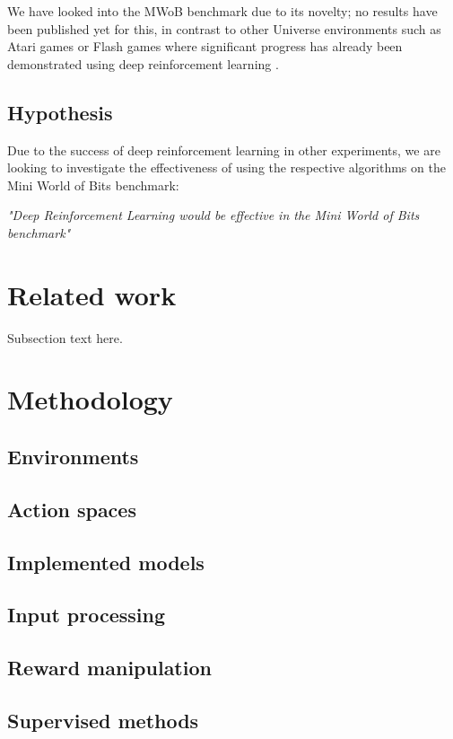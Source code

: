 \documentclass[conference]{IEEEtran}
\begin{document}
We have looked into the MWoB benchmark due to its novelty; no results have been published yet for this, in contrast to other Universe environments such as Atari games or Flash games where significant progress has already been demonstrated using deep reinforcement learning \cite{mnih2013playing}.

\subsection{Hypothesis}
Due to the success of deep reinforcement learning in other experiments, we are looking to investigate the effectiveness of using the respective algorithms on the Mini World of Bits benchmark:
\begin{center}
\textit{"Deep Reinforcement Learning would be effective in the Mini World of Bits benchmark"}
\end{center}

\section{Related work}
Subsection text here.

\section{Methodology}

\subsection{Environments}

\subsection{Action spaces}

\subsection{Implemented models}

\subsection{Input processing}

\subsection{Reward manipulation}

\subsection{Supervised methods}
\end{document}
